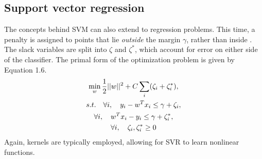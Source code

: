 \subsection{Support vector regression}
The concepts behind SVM can also extend to regression problems.  This time, a penalty is assigned to points that lie \textit{outside} the margin $\gamma$, rather than inside \cite{drucker1997}.  The slack variables are split into $\zeta$ and $\zeta^*$, which account for error on either side of the classifier.  The primal form of the optimization problem is given by Equation 1.6.
%
\begin{gather}
\min \limits_{w} \frac{1}{2} ||w||^2 + C \sum_i (\zeta_i + \zeta^*_i), \\ \notag
s.t. \quad \forall i, \quad y_i - w^T x_i \leq \gamma + \zeta_i, \\ \notag
\forall i, \quad w^T x_i - y_i \leq \gamma + \zeta^*_i, \\ \notag
\forall i, \quad \zeta_i, \zeta^*_i \geq 0
\end{gather}
%
Again, kernels are typically employed, allowing for SVR to learn nonlinear functions.

